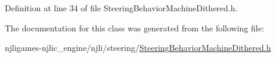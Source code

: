 Definition at line 34 of file Steering\+Behavior\+Machine\+Dithered.\+h.



The documentation for this class was generated from the following file\+:\begin{DoxyCompactItemize}
\item 
njligames-\/njlic\+\_\+engine/njli/steering/\mbox{\hyperlink{_steering_behavior_machine_dithered_8h}{Steering\+Behavior\+Machine\+Dithered.\+h}}\end{DoxyCompactItemize}
